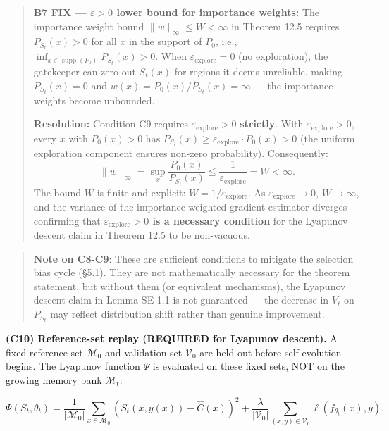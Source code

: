 \documentclass[
  12pt,
]{article}
\begin{document}
\begin{quote}
\textbf{B7 FIX --- \(\varepsilon > 0\) lower bound for importance
weights:} The importance weight bound \(\|w\|_\infty \leq W < \infty\)
in Theorem 12.5 requires \(P_{S_t}(x) > 0\) for all \(x\) in the support
of \(P_0\), i.e.,
\(\inf_{x \in \operatorname{supp}(P_0)} P_{S_t}(x) > 0\). When
\(\varepsilon_{\text{explore}} = 0\) (no exploration), the gatekeeper
can zero out \(S_t(x)\) for regions it deems unreliable, making
\(P_{S_t}(x) = 0\) and \(w(x) = P_0(x)/P_{S_t}(x) = \infty\) --- the
importance weights become unbounded.

\textbf{Resolution:} Condition C9 requires
\(\varepsilon_{\text{explore}} > 0\) \textbf{strictly}. With
\(\varepsilon_{\text{explore}} > 0\), every \(x\) with \(P_0(x) > 0\)
has \(P_{S_t}(x) \geq \varepsilon_{\text{explore}} \cdot P_0(x) > 0\)
(the uniform exploration component ensures non-zero probability).
Consequently:
\[\|w\|_\infty = \sup_{x} \frac{P_0(x)}{P_{S_t}(x)} \leq \frac{1}{\varepsilon_{\text{explore}}} = W < \infty.\]
The bound \(W\) is finite and explicit:
\(W = 1/\varepsilon_{\text{explore}}\). As
\(\varepsilon_{\text{explore}} \to 0\), \(W \to \infty\), and the
variance of the importance-weighted gradient estimator diverges ---
confirming that \textbf{\(\varepsilon_{\text{explore}} > 0\) is a
necessary condition} for the Lyapunov descent claim in Theorem 12.5 to
be non-vacuous.
\end{quote}

\begin{quote}
\textbf{Note on C8-C9}: These are sufficient conditions to mitigate the
selection bias cycle (§5.1). They are not mathematically necessary for
the theorem statement, but without them (or equivalent mechanisms), the
Lyapunov descent claim in Lemma SE-1.1 is not guaranteed --- the
decrease in \(V_t\) on \(P_{S_t}\) may reflect distribution shift rather
than genuine improvement.
\end{quote}

\textbf{(C10) Reference-set replay (REQUIRED for Lyapunov descent).} A
fixed reference set \(\mathcal{M}_0\) and validation set
\(\mathcal{V}_0\) are held out before self-evolution begins. The
Lyapunov function \(\Psi\) is evaluated on these fixed sets, NOT on the
growing memory bank \(\mathcal{M}_t\):

\[\Psi(S_t, \theta_t) = \frac{1}{|\mathcal{M}_0|} \sum_{x \in \mathcal{M}_0} (S_t(x, y(x)) - \hat{C}(x))^2 + \frac{\lambda}{|\mathcal{V}_0|} \sum_{(x,y) \in \mathcal{V}_0} \ell(f_{\theta_t}(x), y).\]
\end{document}
